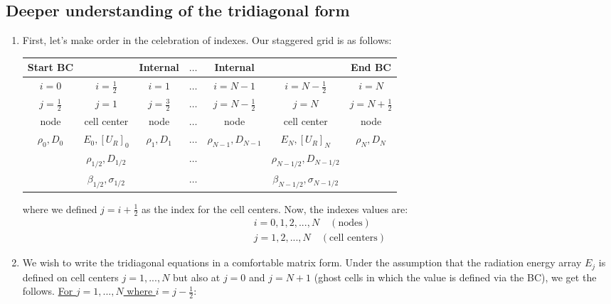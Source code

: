 \documentclass[11pt]{article}
\begin{document}
  \subsection{Deeper understanding of the tridiagonal form}
  \begin{enumerate}
    \item First, let's make order in the celebration of indexes. Our staggered grid is as follows:
    \begin{center}
      \small
      \begin{tabular}{|c|c|c|c|c|c|c|}
      \hline
      \textbf{Start BC} & & \textbf{Internal} & $\dots$ & \textbf{Internal} & & \textbf{End BC} \\ \hline
      $i=0$ & $i=\frac{1}{2}$ & $i=1$ & $\dots$ & $i=N-1$ & $i=N-\frac{1}{2}$ & $i=N$ \\ 
      $j=\frac{1}{2}$ & $\boxed{j=1}$ & $j=\frac{3}{2}$ & $\dots$ & $j=N-\frac{1}{2}$ & $\boxed{j=N}$ & $j=N+\frac{1}{2}$ \\ \hline
      node & cell center & node & $\dots$ & node & cell center & node \\ 
      $\rho_0, D_0$ & $E_0, [U_R]_0$ & $\rho_1, D_1$ & $\dots$ & $\rho_{N-1}, D_{N-1}$ & $E_N, [U_R]_N$ & $\rho_N, D_N$ \\ 
      & $\rho_{1/2}, D_{1/2}$ & & $\dots$ & & $\rho_{N-1/2}, D_{N-1/2}$ & \\ 
      & $\beta_{1/2}, \sigma_{1/2}$ & & $\dots$ & & $\beta_{N-1/2}, \sigma_{N-1/2}$ & \\ \hline
      \end{tabular}
  \end{center}
    where we defined $j=i + \frac{1}{2}$ as the index for the cell centers. Now, the indexes values are:
    \begin{equation}
      \begin{gathered}
        i = 0,1,2,...,N \quad (\text{nodes}) \\
        j = 1,2,...,N \quad (\text{cell centers})
      \end{gathered}
    \end{equation}
    \item We wish to write the tridiagonal equations in a comfortable matrix form. Under the assumption that the radiation energy array $E_j$ is defined on cell centers $j = 1,...,N$ but also at $j=0$ and $j=N+1$ (ghost cells in which the value is defined via the BC), we get the follows. \newline
    \underline{For $j = 1, ..., N$ where $i = j - \frac{1}{2}$}: 

\end{enumerate}
\end{document}
